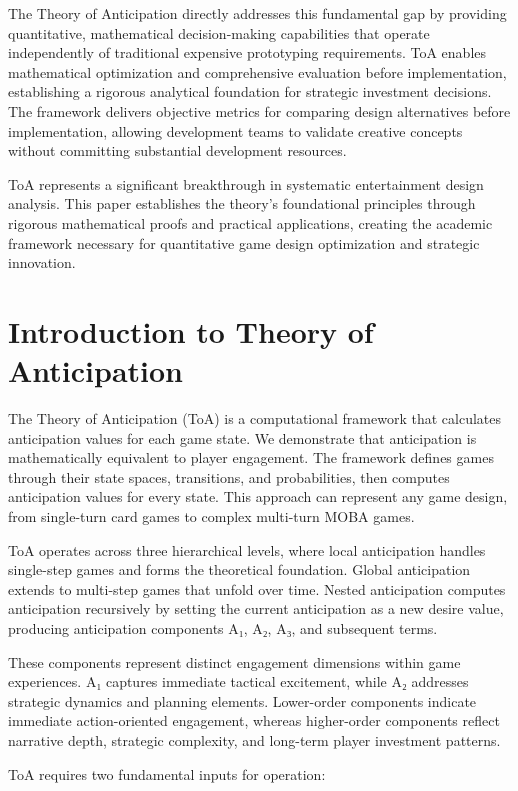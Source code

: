 \documentclass{article}
\begin{document}
The Theory of Anticipation directly addresses this fundamental gap by providing quantitative, mathematical decision-making capabilities that operate independently of traditional expensive prototyping requirements. ToA enables mathematical optimization and comprehensive evaluation before implementation, establishing a rigorous analytical foundation for strategic investment decisions. The framework delivers objective metrics for comparing design alternatives before implementation, allowing development teams to validate creative concepts without committing substantial development resources.

ToA represents a significant breakthrough in systematic entertainment design analysis. This paper establishes the theory's foundational principles through rigorous mathematical proofs and practical applications, creating the academic framework necessary for quantitative game design optimization and strategic innovation.

\section{Introduction to Theory of Anticipation}

The Theory of Anticipation (ToA) is a computational framework that calculates anticipation values for each game state. We demonstrate that anticipation is mathematically equivalent to player engagement. The framework defines games through their state spaces, transitions, and probabilities, then computes anticipation values for every state. This approach can represent any game design, from single-turn card games to complex multi-turn MOBA games.

ToA operates across three hierarchical levels, where local anticipation handles single-step games and forms the theoretical foundation.
Global anticipation extends to multi-step games that unfold over time. Nested anticipation computes anticipation recursively by setting the current anticipation as a new desire value, producing anticipation components A₁, A₂, A₃, and subsequent terms.

These components represent distinct engagement dimensions within game experiences. A₁ captures immediate tactical excitement, while A₂ addresses strategic dynamics and planning elements. Lower-order components indicate immediate action-oriented engagement, whereas higher-order components reflect narrative depth, strategic complexity, and long-term player investment patterns.

ToA requires two fundamental inputs for operation:
\end{document}
